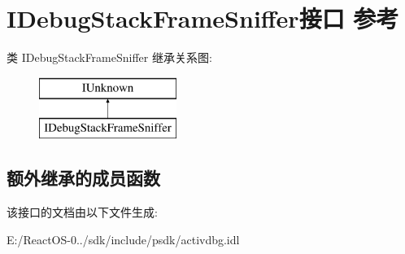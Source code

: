 \hypertarget{interface_i_debug_stack_frame_sniffer}{}\section{I\+Debug\+Stack\+Frame\+Sniffer接口 参考}
\label{interface_i_debug_stack_frame_sniffer}
类 I\+Debug\+Stack\+Frame\+Sniffer 继承关系图\+:\begin{figure}[H]
\begin{center}
\leavevmode
\includegraphics[height=2.000000cm]{interface_i_debug_stack_frame_sniffer}
\end{center}
\end{figure}
\subsection*{额外继承的成员函数}


该接口的文档由以下文件生成\+:\begin{DoxyCompactItemize}
\item 
E\+:/\+React\+O\+S-\/0../sdk/include/psdk/activdbg.\+idl\end{DoxyCompactItemize}
